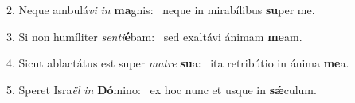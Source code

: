 2. Neque ambulá\textit{vi} \textit{in} \textbf{ma}gnis: \ast\  neque in mirabílibus \textbf{su}per me.\

3. Si non humíliter \textit{sen}\textit{ti}\textbf{é}bam: \ast\  sed exaltávi ánimam \textbf{me}am.\

4. Sicut ablactátus est super \textit{ma}\textit{tre} \textbf{su}a: \ast\  ita retribútio in ánima \textbf{me}a.\

5. Speret Isra\textit{ël} \textit{in} \textbf{Dó}mino: \ast\  ex hoc nunc et usque in \textbf{sǽ}culum.\

